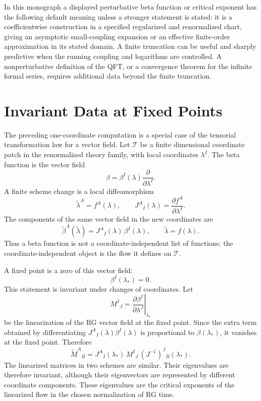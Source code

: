 In this monograph a displayed perturbative beta function or critical exponent
has the following default meaning unless a stronger statement is stated: it is
a coefficientwise construction in a specified regularized and renormalized
chart, giving an asymptotic small-coupling expansion or an effective
finite-order approximation in its stated domain.  A finite truncation can be
useful and sharply predictive when the running coupling and logarithms are
controlled.  A nonperturbative definition of the QFT, or a convergence theorem
for the infinite formal series, requires additional data beyond the finite
truncation.

\section{Invariant Data at Fixed Points}

The preceding one-coordinate computation is a special case of the tensorial
transformation law for a vector field.  Let \(\mathcal T\) be a finite
dimensional coordinate patch in the renormalized theory family, with local
coordinates \(\lambda^I\).  The beta function is the vector field
\[
  \beta=\beta^I(\lambda)\frac{\partial}{\partial\lambda^I}.
\]
A finite scheme change is a local diffeomorphism
\[
  \widetilde\lambda^A=f^A(\lambda),
  \qquad
  J^A{}_I(\lambda)=\frac{\partial f^A}{\partial\lambda^I}.
\]
The components of the same vector field in the new coordinates are
\[
  \widetilde\beta^A(\widetilde\lambda)
  =
  J^A{}_I(\lambda)\,\beta^I(\lambda),
  \qquad
  \widetilde\lambda=f(\lambda).
\]
Thus a beta function is not a coordinate-independent list of functions; the
coordinate-independent object is the flow it defines on \(\mathcal T\).

A fixed point is a zero of this vector field:
\[
  \beta^I(\lambda_\ast)=0 .
\]
This statement is invariant under changes of coordinates.  Let
\[
  M^I{}_J
  =
  \left.
  \frac{\partial\beta^I}{\partial\lambda^J}
  \right|_{\lambda_\ast}
\]
be the linearization of the RG vector field at the fixed point.  Since the
extra term obtained by differentiating \(J^A{}_I(\lambda)\beta^I(\lambda)\)
is proportional to \(\beta(\lambda_\ast)\), it vanishes at the fixed point.
Therefore
\[
  \widetilde M^A{}_B
  =
  J^A{}_I(\lambda_\ast)\,
  M^I{}_J\,
  (J^{-1})^J{}_B(\lambda_\ast).
\]
The linearized matrices in two schemes are similar.  Their eigenvalues are
therefore invariant, although their eigenvectors are represented by different
coordinate components.  These eigenvalues are the critical exponents of the
linearized flow in the chosen normalization of RG time.

